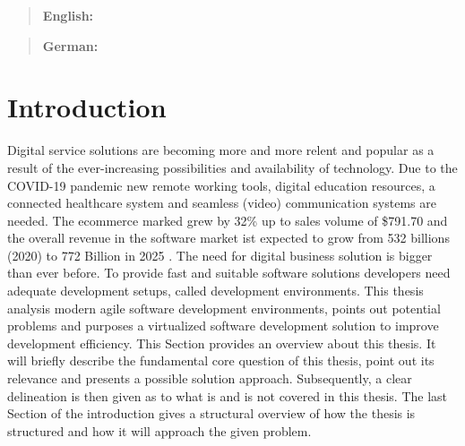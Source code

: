 \documentclass[12pt, a4paper]{article}
\begin{document}

\newpage\null\thispagestyle{empty}\newpage

\maketitle
\begin{abstract}
    \textbf{English:} \lipsum[20]
\end{abstract}
\begin{abstract}
    \textbf{German:} \lipsum[20]
\end{abstract}
\newpage

\tableofcontents
\newpage

\setcounter{lastroman}{\value{page}}


\section{Introduction}\label{sec::intro}
Digital service solutions are becoming more and more relent and popular as a result of the ever-increasing possibilities and availability of technology. Due to the COVID-19 pandemic new remote working tools, digital education resources, a connected healthcare system and seamless (video) communication systems are needed. The ecommerce marked grew by 32\% up to sales volume of \$791.70 \cite{online_shopping_inc} and the overall revenue in the software market ist expected to grow from 532 billions (2020) to 772 Billion in 2025 \cite{software_industry_groth}. The need for digital business solution is bigger than ever before. To provide fast and suitable software solutions developers need adequate development setups, called development environments. This thesis analysis modern agile software development environments, points out potential problems and purposes a virtualized software development solution to improve development efficiency.\newline
This Section provides an overview about this thesis. It will briefly describe the fundamental core question of this thesis, point out its relevance and presents a possible solution approach. Subsequently, a clear delineation is then given as to what is and is not covered in this thesis. The last Section of the introduction gives a structural overview of how the thesis is structured and how it will approach the given problem.
\end{document}
